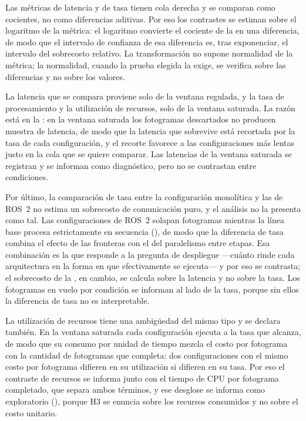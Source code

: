 Las métricas de latencia y de tasa tienen cola derecha y se comparan como
cocientes, no como diferencias aditivas. Por eso los contrastes se estiman
sobre el logaritmo de la métrica: el logaritmo convierte el cociente de la
 en una diferencia, de modo que el intervalo de confianza
de esa diferencia es, tras exponenciar, el intervalo del sobrecosto relativo.
La transformación no supone normalidad de la métrica; la normalidad, cuando la
prueba elegida la exige, se verifica sobre las diferencias y no sobre los
valores.

La latencia que se compara proviene solo de la ventana regulada, y la tasa de
procesamiento y la utilización de recursos, solo de la ventana saturada. La
razón está en la : en la ventana saturada los fotogramas
descartados no producen muestra de latencia, de modo que la latencia que
sobrevive está recortada por la tasa de cada configuración, y el recorte
favorece a las configuraciones más lentas justo en la cola que se quiere
comparar. Las latencias de la ventana saturada se registran y se informan como
diagnóstico, pero no se contrastan entre condiciones.

Por último, la comparación de tasa entre la configuración monolítica y las de
ROS~2 no estima un sobrecosto de comunicación puro, y el análisis no la
presenta como tal. Las configuraciones de ROS~2 solapan fotogramas mientras la
línea base procesa estrictamente en secuencia (), de
modo que la diferencia de tasa combina el efecto de las fronteras con el del
paralelismo entre etapas. Esa combinación es la que responde a la pregunta de
despliegue ---cuánto rinde cada arquitectura en la forma en que efectivamente
se ejecuta--- y por eso se contrasta; el sobrecosto de la ,
en cambio, se calcula sobre la latencia y no sobre la tasa. Los fotogramas en
vuelo por condición se informan al lado de la tasa, porque sin ellos la
diferencia de tasa no es interpretable.

La utilización de recursos tiene una ambigüedad del mismo tipo y se declara
también. En la ventana saturada cada configuración ejecuta a la tasa que
alcanza, de modo que su consumo por unidad de tiempo mezcla el costo por
fotograma con la cantidad de fotogramas que completa: dos configuraciones con
el mismo costo por fotograma difieren en su utilización si difieren en su tasa.
Por eso el contraste de recursos se informa junto con el tiempo de CPU por
fotograma completado, que separa ambos términos, y ese desglose se informa como
exploratorio (), porque H3 se enuncia sobre los recursos
consumidos y no sobre el costo unitario.

